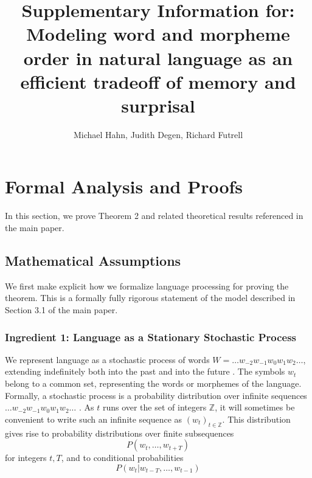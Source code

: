 \documentclass[11pt,letterpaper]{article}
\title{Supplementary Information for: Modeling word and morpheme order in natural language as an efficient tradeoff of memory and surprisal}
\author{Michael Hahn, Judith Degen, Richard Futrell}
\newcounter{theorem}
\begin{document}
\maketitle

\tableofcontents


%
%
%


\section{Formal Analysis and Proofs}

In this section, we prove Theorem 2 and related theoretical results referenced in the main paper.

\subsection{Mathematical Assumptions}\label{sec:math-assumptions}

We first make explicit how we formalize language processing for proving the theorem.
This is a formally fully rigorous statement of the model described in Section 3.1 of the main paper.


\subsubsection{Ingredient 1: Language as a Stationary Stochastic Process}
We represent language as a stochastic process of words $W = \dots w_{-2} w_{-1} w_0 w_{1} w_{2} \dots$, extending indefinitely both into the past and into the future \citep{doob1953stochastic}.
The symbols $w_t$ belong to a common set, representing the words or morphemes of the language.
Formally, a stochastic process is a probability distribution over infinite sequences $\dots w_{-2} w_{-1} w_0 w_{1} w_{2} \dots$ \citep{doob1953stochastic}.
As $t$ runs over the set of integers $\mathbb{Z}$, it will sometimes be convenient to write such an infinite sequence as $(w_t)_{t \in \mathbb{Z}}$.
This distribution gives rise to probability distributions over finite subsequences
\begin{equation}
	P(w_t, \dots, w_{t+T})
\end{equation}
for integers $t, T$, and to conditional probabilities
\begin{equation}
	P(w_t | w_{t-T}, \dots, w_{t-1})
\end{equation}
\end{document}
